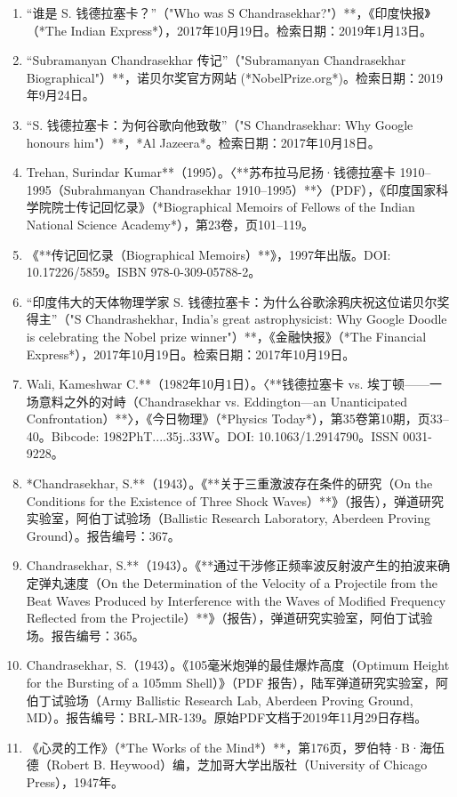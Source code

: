 \begin{enumerate}
\item “谁是 S. 钱德拉塞卡？”（"Who was S Chandrasekhar?"）**，《印度快报》（*The Indian Express*），2017年10月19日。检索日期：2019年1月13日。
\item “Subramanyan Chandrasekhar 传记”（"Subramanyan Chandrasekhar Biographical"）**，诺贝尔奖官方网站 (*NobelPrize.org*)。检索日期：2019年9月24日。
\item “S. 钱德拉塞卡：为何谷歌向他致敬”（"S Chandrasekhar: Why Google honours him"）**，*Al Jazeera*。检索日期：2017年10月18日。
\item Trehan, Surindar Kumar**（1995）。〈**苏布拉马尼扬·钱德拉塞卡 1910–1995（Subrahmanyan Chandrasekhar 1910–1995）**〉（PDF），《印度国家科学院院士传记回忆录》（*Biographical Memoirs of Fellows of the Indian National Science Academy*），第23卷，页101–119。
\item 《**传记回忆录（Biographical Memoirs）**》，1997年出版。DOI: 10.17226/5859。ISBN 978-0-309-05788-2。
\item “印度伟大的天体物理学家 S. 钱德拉塞卡：为什么谷歌涂鸦庆祝这位诺贝尔奖得主”（"S Chandrashekhar, India's great astrophysicist: Why Google Doodle is celebrating the Nobel prize winner"）**，《金融快报》（*The Financial Express*），2017年10月19日。检索日期：2017年10月19日。
\item Wali, Kameshwar C.**（1982年10月1日）。〈**钱德拉塞卡 vs. 埃丁顿——一场意料之外的对峙（Chandrasekhar vs. Eddington—an Unanticipated Confrontation）**〉，《今日物理》（*Physics Today*），第35卷第10期，页33–40。Bibcode: 1982PhT....35j..33W。DOI: 10.1063/1.2914790。ISSN 0031-9228。
\item *Chandrasekhar, S.**（1943）。《**关于三重激波存在条件的研究（On the Conditions for the Existence of Three Shock Waves）**》（报告），弹道研究实验室，阿伯丁试验场（Ballistic Research Laboratory, Aberdeen Proving Ground）。报告编号：367。
\item Chandrasekhar, S.**（1943）。《**通过干涉修正频率波反射波产生的拍波来确定弹丸速度（On the Determination of the Velocity of a Projectile from the Beat Waves Produced by Interference with the Waves of Modified Frequency Reflected from the Projectile）**》（报告），弹道研究实验室，阿伯丁试验场。报告编号：365。
\item Chandrasekhar, S.（1943）。《105毫米炮弹的最佳爆炸高度（Optimum Height for the Bursting of a 105mm Shell）》（PDF 报告），陆军弹道研究实验室，阿伯丁试验场（Army Ballistic Research Lab, Aberdeen Proving Ground, MD）。报告编号：BRL-MR-139。原始PDF文档于2019年11月29日存档。
\item 《心灵的工作》（*The Works of the Mind*）**，第176页，罗伯特·B·海伍德（Robert B. Heywood）编，芝加哥大学出版社（University of Chicago Press），1947年。

\end{enumerate}
